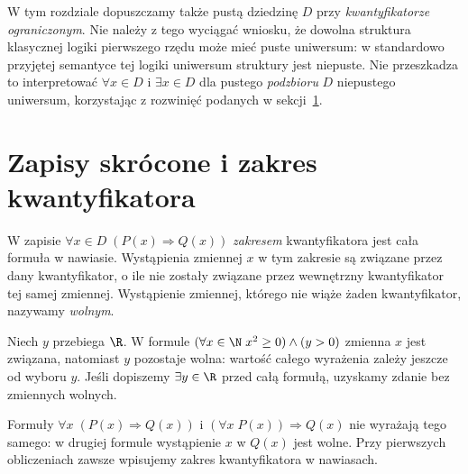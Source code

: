 \begin{uwaga}
\label{rem:empty-domain-semantics-xli}
W tym rozdziale dopuszczamy także pustą dziedzinę $D$
przy \emph{kwantyfikatorze ograniczonym}.
Nie należy z tego wyciągać wniosku, że dowolna
struktura klasycznej logiki pierwszego rzędu może
mieć puste uniwersum: w standardowo przyjętej
semantyce tej logiki uniwersum struktury jest niepuste.
Nie przeszkadza to interpretować $\forall x\in D$
i $\exists x\in D$ dla pustego \emph{podzbioru}
$D$ niepustego uniwersum, korzystając z rozwinięć
podanych w sekcji~\ref{sec:quantifier-scope}.
\end{uwaga}

\section{Zapisy skrócone i zakres kwantyfikatora}\label{sec:quantifier-scope}
\begin{definicja}
W zapisie $\forall x\in D\;(P(x)\Rightarrow Q(x))$
\emph{zakresem} kwantyfikatora jest cała formuła
w nawiasie. Wystąpienia zmiennej $x$ w tym zakresie są związane
przez dany kwantyfikator, o ile nie zostały związane
przez wewnętrzny kwantyfikator tej samej zmiennej.
Wystąpienie zmiennej, którego nie wiąże żaden
kwantyfikator, nazywamy \emph{wolnym}.
\end{definicja}

\begin{przyklad}
Niech $y$ przebiega $\R$. W formule
$(\forall x\in\N\;x^2\ge0)\land(y>0)$
zmienna $x$ jest związana, natomiast $y$ pozostaje wolna:
wartość całego wyrażenia zależy jeszcze od wyboru $y$.
Jeśli dopiszemy $\exists y\in\R$ przed całą formułą,
uzyskamy zdanie bez zmiennych wolnych.
\end{przyklad}

\begin{uwaga}
Formuły $\forall x\;(P(x)\Rightarrow Q(x))$
i $(\forall x\;P(x))\Rightarrow Q(x)$ nie wyrażają
tego samego: w drugiej formule wystąpienie $x$ w
$Q(x)$ jest wolne. Przy pierwszych obliczeniach
zawsze wpisujemy zakres kwantyfikatora w nawiasach.
\end{uwaga}

